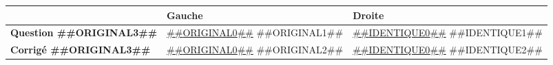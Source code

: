 \documentclass[a4paper,11pt]{article}
\begin{document}
\begin{longtable}{|p{3cm}|p{7.5cm}|p{7.5cm}|}
\hline 
 & Gauche & Droite \\



\hline 
\textbf{Question ##{{ORIGINAL3}}##} & \underline{##{{ORIGINAL0}}##} \newline ##{{ORIGINAL1}}## & \underline{##{{IDENTIQUE0}}##} \newline ##{{IDENTIQUE1}}## \\




\hline 
\textbf{Corrigé ##{{ORIGINAL3}}##} & \underline{##{{ORIGINAL0}}##} \newline ##{{ORIGINAL2}}## & \underline{##{{IDENTIQUE0}}##} \newline ##{{IDENTIQUE2}}## \\




\hline 
\end{longtable} 
\end{document}
